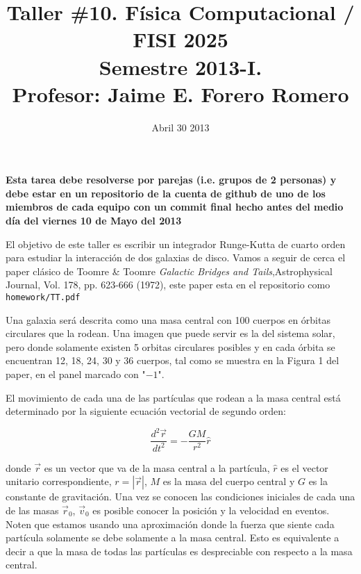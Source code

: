 \documentclass{article}
\title{Taller \#10. F\'isica Computacional / FISI 2025 \\Semestre
  2013-I. \\ Profesor: Jaime E. Forero Romero}
\date{Abril 30 2013}
\begin{document}
\maketitle

{\bf Esta tarea debe resolverse por parejas (i.e. grupos de 2
  personas) y debe estar en un repositorio de la cuenta de github de
  uno de los miembros de cada equipo con un commit final hecho antes del
  medio d\'ia del viernes 10 de Mayo del 2013}  


El objetivo de este taller es escribir un integrador Runge-Kutta de
cuarto orden para estudiar la interacci\'on de dos galaxias de disco. Vamos a
seguir de cerca el paper cl\'asico de Toomre \& Toomre
\textit{Galactic Bridges and Tails},Astrophysical Journal, Vol. 178,
pp. 623-666 (1972), este paper esta en el repositorio como
\verb"homework/TT.pdf" 

Una galaxia ser\'a descrita como una masa central con 100
cuerpos en \'orbitas circulares que la rodean. Una imagen que puede
servir es la del sistema solar, pero donde solamente existen 5 orbitas
circulares posibles y en cada \'orbita se encuentran 12, 18, 24, 30 y 36
cuerpos, tal como se muestra en la Figura 1 del paper, en el panel
marcado con "$-1$". 

El movimiento de cada una de las part\'iculas que rodean a la masa
central est\'a determinado por la siguiente ecuaci\'on vectorial de
segundo orden:


\begin{equation}
\frac{d^2\vec{r}}{dt^2} = -\frac{GM}{r^2} \hat{r}
\end{equation}

donde $\vec{r}$  es un vector que va de la masa central a la
part\'icula, $\hat{r}$ es el vector unitario correspondiente,
$r=|\vec{r}|$, $M$ es la masa del cuerpo central y $G$ es la constante
de gravitaci\'on.  Una vez se conocen las condiciones iniciales de
cada una de las masas $\vec{r}_0$, $\vec{v}_0$ es posible conocer la
  posici\'on y la velocidad en eventos. Noten que estamos usando una
  aproximaci\'on donde la fuerza que siente cada part\'icula solamente
  se debe solamente a la masa central. Esto es equivalente a decir a
  que la masa de todas las part\'iculas es despreciable con respecto a
  la masa central. 
\end{document}
